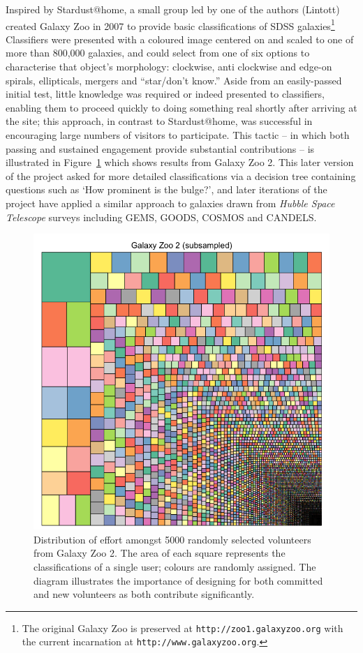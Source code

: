 \documentclass{ar2e}
\def\Fref#1{Figure~\ref{#1}\xspace}
\def\url#1{\texttt{#1}}
\begin{document}
Inspired by Stardust@home, a small group led by one of the authors (Lintott) created
Galaxy Zoo in 2007 to provide basic classifications of SDSS
galaxies\footnote{The original Galaxy Zoo is preserved at
\url{http://zoo1.galaxyzoo.org} with the current incarnation at
\url{http://www.galaxyzoo.org}.} Classifiers were presented with a coloured
image centered on and scaled to one of more than 800,000 galaxies, and could
select from one of six options to characterise that object's morphology: 
clockwise, anti clockwise and edge-on spirals,
ellipticals, mergers and ``star/don't know.'' Aside from  an easily-passed
initial test, little knowledge was required or indeed presented to classifiers,
enabling them to proceed quickly to doing something real 
shortly after arriving at the
site; this approach, in contrast to Stardust@home, was
successful in encouraging large numbers of visitors to participate. 
This tactic -- in which both passing and sustained engagement provide
substantial contributions -- is illustrated in \Fref{fig:gz2} which shows results from
Galaxy Zoo 2. This later version of the project asked for more detailed
classifications via a decision tree containing questions such as `How prominent
is the bulge?', and later iterations of the project have applied a similar
approach to galaxies drawn from \textit{Hubble Space Telescope} surveys including
\textsc{GEMS, GOODS, COSMOS} and \textsc{CANDELS}. 


\begin{figure}[!ht]
\centering\includegraphics[width=\linewidth]{figs/gz2squares.png}
\caption{Distribution of effort amongst 5000 randomly selected volunteers from
Galaxy Zoo 2. The area of each square represents the classifications of a single
user; colours are randomly assigned. The diagram illustrates the importance of
designing for both committed and new volunteers as both contribute significantly.}
\label{fig:gz2}
\end{figure}
\end{document}
